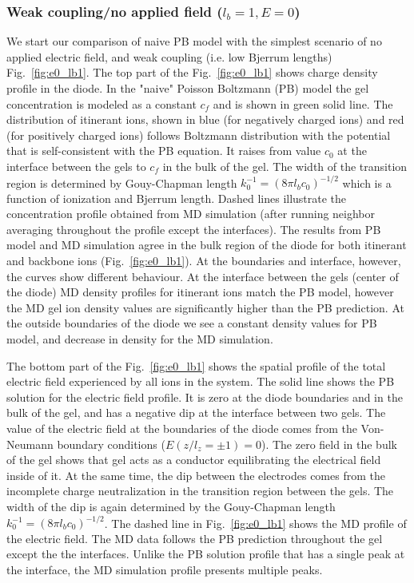 \documentclass[twoside,twocolumn,9pt]{article}
\begin{document}
\subsubsection{Weak coupling/no applied field ($l_b=1, E=0$)}

We start our comparison of naive PB model with the simplest scenario of no applied electric field, and weak coupling (i.e. low Bjerrum lengths) Fig.~\ref{fig:e0_lb1}. The top part of the Fig.~\ref{fig:e0_lb1} shows charge density profile in the diode. In the "naive" Poisson Boltzmann (PB) model the gel concentration is modeled as a constant $c_f$ and is shown in green solid line. The distribution of itinerant ions, shown in blue (for negatively charged ions) and red (for positively charged ions) follows Boltzmann distribution with the potential that is self-consistent with the PB equation. It raises from value $c_0$ at the interface between the gels to $c_f$ in the bulk of the gel. The width of the transition region is determined by Gouy-Chapman length $k_0^{-1}=(8 \pi l_b c_0)^{-1/2}$ which is a function of ionization and Bjerrum length.  Dashed lines illustrate the concentration profile obtained from MD simulation (after running neighbor averaging throughout the profile except the interfaces). The results from PB model and MD simulation agree in the bulk region of the diode for both itinerant and backbone ions (Fig.~\ref{fig:e0_lb1}). At the boundaries and interface, however, the curves show different behaviour. At the interface between the gels (center of the diode) MD density profiles for itinerant ions match the PB model, however the MD gel ion density values are significantly higher than the PB prediction. At the outside boundaries of the diode we see a constant density values for PB model, and decrease in density for the MD simulation. 

The bottom part of the Fig.~\ref{fig:e0_lb1} shows the spatial profile of the total electric field experienced by all ions in the system. The solid line shows the PB solution for the electric field profile. It is zero at the diode boundaries and in the bulk of the gel, and has a negative dip at the interface between two gels. The value of the electric field at the boundaries of the diode comes from the Von-Neumann boundary conditions ($E(z/l_z = \pm 1) = 0$). The zero field in the bulk of the gel shows that gel acts as a conductor equilibrating the electrical field inside of it. At the same time, the dip between the electrodes comes from the incomplete charge neutralization in the transition region between the gels. The width of the dip is again determined by the Gouy-Chapman length $k_0^{-1}=(8 \pi l_b c_0)^{-1/2}$. The dashed line in Fig.~\ref{fig:e0_lb1} shows the MD profile of the electric field. The MD data follows the PB prediction throughout the gel except the the interfaces. Unlike the PB solution profile that has a single peak at the interface, the MD simulation profile presents multiple peaks. 
\end{document}
